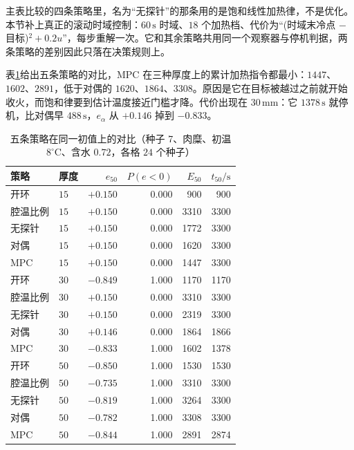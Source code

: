 主表比较的四条策略里，名为“无探针”的那条用的是饱和线性加热律，不是优化。本节补上真正的滚动时域控制：\(60\,\mathrm{s}\) 时域、\(18\) 个加热档、代价为“(时域末冷点 \(-\) 目标)\(^2+0.2u\)”，每步重解一次。它和其余策略共用同一个观察器与停机判据，两条策略的差别因此只落在决策规则上。

表\ref{tab:fivepol}{}给出五条策略的对比，MPC 在三种厚度上的累计加热指令都最小：\(1447\)、\(1602\)、\(2891\)，低于对偶的 \(1620\)、\(1864\)、\(3308\)。原因是它在目标被越过之前就开始收火，而饱和律要到估计温度接近门槛才降。代价出现在 \(30\,\mathrm{mm}\)：它 \(1378\,\mathrm{s}\) 就停机，比对偶早 \(488\,\mathrm{s}\)，\(e_{\alpha}\) 从 \(+0.146\) 掉到 \(-0.833\)。

\begin{table}[t]
\centering
\caption{五条策略在同一初值上的对比（种子 7、肉糜、初温 \(8^\circ\mathrm{C}\)、含水 \(0.72\)，各格 \(24\) 个种子）}
\label{tab:fivepol}
\setlength{\tabcolsep}{4.0pt}
{\small
\begin{tabular}{llrrrr}
\toprule
策略 & 厚度 & \(e_{50}\) & \(P(e{<}0)\) & \(E_{50}\) & \(t_{50}/\mathrm{s}\) \\
\midrule
开环 & \(15\) & \(+0.150\) & 0.000 & 900 & 900 \\
腔温比例 & \(15\) & \(+0.150\) & 0.000 & 3310 & 3300 \\
无探针 & \(15\) & \(+0.150\) & 0.000 & 1772 & 3300 \\
对偶 & \(15\) & \(+0.150\) & 0.000 & 1620 & 3300 \\
MPC & \(15\) & \(+0.150\) & 0.000 & 1447 & 3300 \\
\midrule
开环 & \(30\) & \(-0.849\) & 1.000 & 1170 & 1170 \\
腔温比例 & \(30\) & \(+0.150\) & 0.000 & 3310 & 3300 \\
无探针 & \(30\) & \(+0.150\) & 0.000 & 2319 & 3300 \\
对偶 & \(30\) & \(+0.146\) & 0.000 & 1864 & 1866 \\
MPC & \(30\) & \(-0.833\) & 1.000 & 1602 & 1378 \\
\midrule
开环 & \(50\) & \(-0.850\) & 1.000 & 1530 & 1530 \\
腔温比例 & \(50\) & \(-0.735\) & 1.000 & 3310 & 3300 \\
无探针 & \(50\) & \(-0.819\) & 1.000 & 3264 & 3300 \\
对偶 & \(50\) & \(-0.782\) & 1.000 & 3308 & 3300 \\
MPC & \(50\) & \(-0.844\) & 1.000 & 2891 & 2874 \\
\bottomrule
\end{tabular}}
\end{table}

